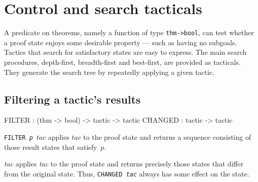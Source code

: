 \section{Control and search tacticals}

A predicate on theorems, namely a function of type \hbox{\tt thm->bool},
can test whether a proof state enjoys some desirable property --- such as
having no subgoals.  Tactics that search for satisfactory states are easy
to express.  The main search procedures, depth-first, breadth-first and
best-first, are provided as tacticals.  They generate the search tree by
repeatedly applying a given tactic.


\subsection{Filtering a tactic's results}
\begin{ttbox} 
FILTER  : (thm -> bool) -> tactic -> tactic
CHANGED : tactic -> tactic
\end{ttbox}
\begin{ttdescription}
\item[\tt FILTER {\it p} $tac$] 
applies $tac$ to the proof state and returns a sequence consisting of those
result states that satisfy~$p$.

\item[\ttindexbold{CHANGED} {\it tac}] 
applies {\it tac\/} to the proof state and returns precisely those states
that differ from the original state.  Thus, \hbox{\tt CHANGED {\it tac}}
always has some effect on the state.
\end{ttdescription}


